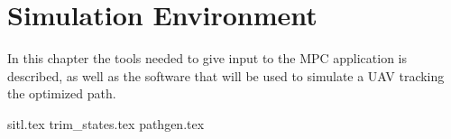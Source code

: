 \chapter{Simulation Environment}
\label{ch:sim_env}

In this chapter the tools needed to give input to the MPC application is described, as well as the software that will be used to simulate a UAV tracking the optimized path.

{sitl.tex}
{trim_states.tex}
{pathgen.tex}